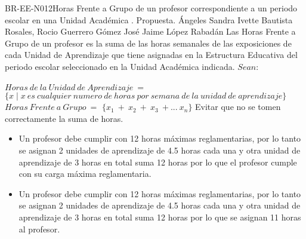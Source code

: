 \begin{BusinessRule}{BR-EE-N012}{Horas Frente a Grupo de un profesor correspondiente a un periodo escolar en una Unidad Académica}
	{\bcCondition}    %
	{\btEnabler}     %
	{\blControlling}    %
	.
	\BRItem[Estado] Propuesta.
	 Ángeles
	 Sandra Ivette Bautista Rosales, Rocio Guerrero Gómez
	 José Jaime López Rabadán
	\BRItem[Descripción] Las Horas Frente a Grupo de un profesor es la suma de las horas semanales de las exposiciones de cada Unidad de Aprendizaje que tiene asignadas en la Estructura Educativa del periodo escolar seleccionado en la Unidad Académica indicada.
	\BRItem[Sentencia] $Sean:$ \\\\
	$Horas\ de\ la\ Unidad\ de\ Aprendizaje\ =$ $\{x \mid x\ es\ cualquier\ numero\ de\ horas\ por\ semana\ de\ la\ unidad\ de\ aprendizaje\}$
	$Horas\ Frente\ a\ Grupo\ =$ $\{x_{1}\ +\ x_{2}\ +\ x_{3}\ +...\ x_{n}\}$
	\BRItem[Motivación] Evitar que no se tomen correctamente la suma de horas.
	 \cdtEmpty
		\begin{itemize}
			\item Un profesor debe cumplir con 12 horas máximas reglamentarias, por lo tanto se asignan 2 unidades de aprendizaje de 4.5 horas cada una y otra unidad de aprendizaje de 3 horas en total suma 12 horas por lo que el profesor cumple con su carga máxima reglamentaria.
		\end{itemize}
		\begin{itemize}
			\item Un profesor debe cumplir con 12 horas máximas reglamentarias, por lo tanto se asignan 2 unidades de aprendizaje de 4.5 horas cada una y otra unidad de aprendizaje de 3 horas en total suma 12 horas por lo que se asignan 11 horas al profesor. 
		\end{itemize}
\end{BusinessRule}

